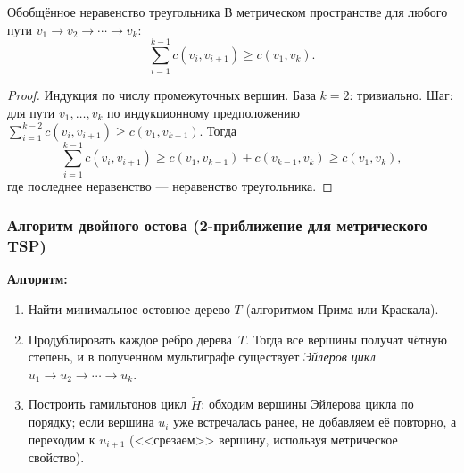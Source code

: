 \begin{Statement}{Обобщённое неравенство треугольника}{}
	В метрическом пространстве для любого пути $v_1 \to v_2 \to \cdots \to v_k$:
	\[
	\sum_{i=1}^{k-1} c(v_i, v_{i+1}) \geq c(v_1, v_k).
	\]
\end{Statement}

\begin{proof}
	Индукция по числу промежуточных вершин. База $k=2$: тривиально. Шаг: для пути $v_1,\ldots,v_k$ по индукционному предположению $\sum_{i=1}^{k-2}c(v_i,v_{i+1}) \geq c(v_1,v_{k-1})$. Тогда
	\[
	\sum_{i=1}^{k-1} c(v_i,v_{i+1}) \geq c(v_1,v_{k-1}) + c(v_{k-1},v_k) \geq c(v_1,v_k),
	\]
	где последнее неравенство --- неравенство треугольника.
\end{proof}

\subsubsection*{Алгоритм двойного остова (2-приближение для метрического TSP)}

\textbf{Алгоритм:}
\begin{enumerate}
	\item Найти минимальное остовное дерево $T$ (алгоритмом Прима или Краскала).
	\item Продублировать каждое ребро дерева~$T$. Тогда все вершины получат чётную степень, и в полученном мультиграфе существует \emph{Эйлеров цикл} $u_1 \to u_2 \to \cdots \to u_k$.
	\item Построить гамильтонов цикл $\widetilde{H}$: обходим вершины Эйлерова цикла по порядку; если вершина $u_i$ уже встречалась ранее, не добавляем её повторно, а переходим к $u_{i+1}$ (<<срезаем>> вершину, используя метрическое свойство).
\end{enumerate}

